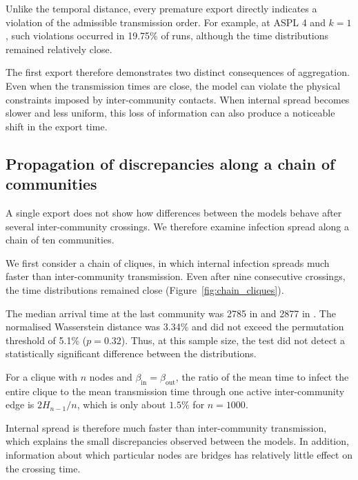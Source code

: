 Unlike the temporal distance, every premature export directly indicates a violation of the admissible transmission order. For example, at ASPL 4 and $k=1$, such violations occurred in 19.75\% of runs, although the time distributions remained relatively close.

The first export therefore demonstrates two distinct consequences of aggregation. Even when the transmission times are close, the model can violate the physical constraints imposed by inter-community contacts. When internal spread becomes slower and less uniform, this loss of information can also produce a noticeable shift in the export time.


\subsection{Propagation of discrepancies along a chain of communities}
\label{sec:res_chain_random}

A single export does not show how differences between the models behave after several inter-community crossings. We therefore examine infection spread along a chain of ten communities.

We first consider a chain of cliques, in which internal infection spreads much faster than inter-community transmission. Even after nine consecutive crossings, the time distributions remained close (Figure~\ref{fig:chain_cliques}).

The median arrival time at the last community was 2785 in \Full{} and 2877 in \TS{}. The normalised Wasserstein distance was 3.34\% and did not exceed the permutation threshold of 5.1\% ($p=0.32$). Thus, at this sample size, the test did not detect a statistically significant difference between the distributions.

For a clique with $n$ nodes and $\beta_{\mathrm{in}}=\beta_{\mathrm{out}}$, the ratio of the mean time to infect the entire clique to the mean transmission time through one active inter-community edge is $2H_{n-1}/n$, which is only about $1.5\%$ for $n=1000$.

Internal spread is therefore much faster than inter-community transmission, which explains the small discrepancies observed between the models. In addition, information about which particular nodes are bridges has relatively little effect on the crossing time.


